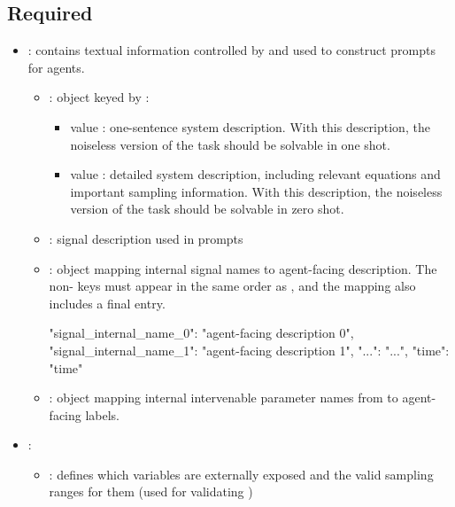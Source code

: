 \documentclass[11pt]{article}
\begin{document}
\subsection*{Required}
\begin{itemize}
\item {}: contains textual information controlled by \termDescLevel and used to construct prompts for agents.
\begin{itemize}
    \item {}: object keyed by \termDescLevel:
    \begin{itemize}
        \item \termDescLevel value : one-sentence system description.
        With this description, the noiseless version of the task should be solvable in one shot. 
        \item \termDescLevel value : detailed system description, including relevant equations and important sampling information.
        With this description, the noiseless version of the task should be solvable in zero shot.
    \end{itemize}
    \item {}: signal description used in prompts
    \item {}: object mapping internal signal names to agent-facing description. 
    The non- keys must appear in the same order as , and the mapping also includes a final  entry.
    \begin{DocCode}
{
  "signal_internal_name_0": "agent-facing description 0",
  "signal_internal_name_1": "agent-facing description 1",
  "...": "...",
  "time": "time"
}
    \end{DocCode}
    \item {}: object mapping internal intervenable parameter names from  to agent-facing labels. 
\end{itemize}
\item {}: 
\begin{itemize}
    \item {}: defines which variables are externally exposed and the valid sampling ranges for them (used for validating )
    \begin{itemize}

\end{itemize}
\end{itemize}
\end{itemize}
\end{document}
